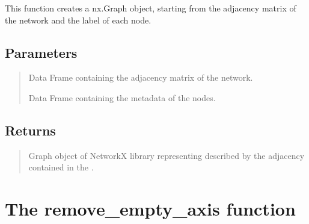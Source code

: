 \documentclass[letterpaper,10pt,english]{sphinxmanual}
\begin{document}
\begin{fulllineitems}
\label{\detokenize{index:hicanalysis.preprocessing.create_graph}}
\pysigstartsignatures
{}
\pysigstopsignatures
\sphinxAtStartPar
This function creates a nx.Graph object, starting from the adjacency matrix of the network and the label of each node.


\subsection{Parameters}
\label{\detokenize{index:parameters}}\begin{quote}
\begin{description}
\sphinxAtStartPar
Data Frame containing the adjacency matrix of the network.

\sphinxAtStartPar
Data Frame containing the metadata of the nodes.

\end{description}
\end{quote}


\subsection{Returns}
\label{\detokenize{index:returns}}\begin{quote}
\begin{description}
\sphinxAtStartPar
Graph object of NetworkX library representing described by the adjacency contained in the .

\end{description}
\end{quote}

\end{fulllineitems}



\section{The remove\_empty\_axis function}
\label{\detokenize{index:the-remove-empty-axis-function}}
\end{document}
